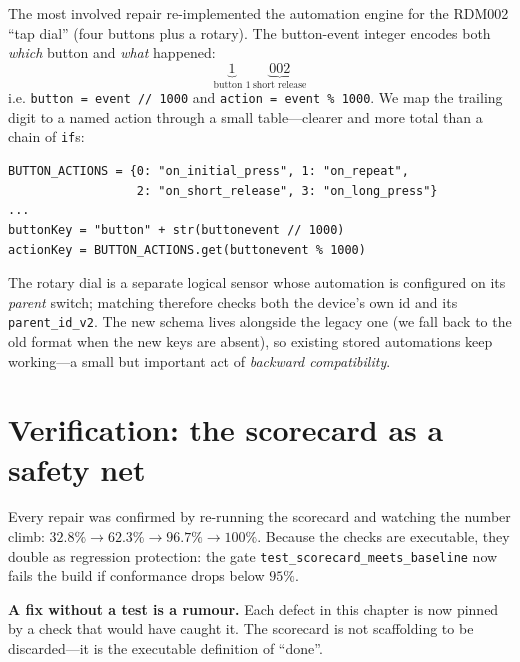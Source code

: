 \documentclass[11pt,a4paper]{article}
\newcommand{\code}[1]{\texttt{#1}}
\begin{document}
The most involved repair re-implemented the automation engine for the RDM002
``tap dial'' (four buttons plus a rotary). The button-event integer encodes both
\emph{which} button and \emph{what} happened:
\[
  \underbrace{1}_{\text{button }1}\,\underbrace{002}_{\text{short release}}
\]
i.e. \code{button = event // 1000} and \code{action = event \% 1000}. We map the
trailing digit to a named action through a small table---clearer and more
total than a chain of \code{if}s:

\begin{lstlisting}
BUTTON_ACTIONS = {0: "on_initial_press", 1: "on_repeat",
                  2: "on_short_release", 3: "on_long_press"}
...
buttonKey = "button" + str(buttonevent // 1000)
actionKey = BUTTON_ACTIONS.get(buttonevent % 1000)
\end{lstlisting}

The rotary dial is a separate logical sensor whose automation is configured on
its \emph{parent} switch; matching therefore checks both the device's own id and
its \code{parent\_id\_v2}. The new schema lives alongside the legacy one (we
fall back to the old format when the new keys are absent), so existing stored
automations keep working---a small but important act of
\emph{backward compatibility}.

\section{Verification: the scorecard as a safety net}

Every repair was confirmed by re-running the scorecard and watching the number
climb: $32.8\% \to 62.3\% \to 96.7\% \to 100\%$. Because the checks are
executable, they double as regression protection: the gate
\code{test\_scorecard\_meets\_baseline} now fails the build if conformance drops
below $95\%$.

\begin{keyidea}
\textbf{A fix without a test is a rumour.} Each defect in this chapter is now
pinned by a check that would have caught it. The scorecard is not scaffolding to
be discarded---it is the executable definition of ``done''.
\end{keyidea}

\end{document}
